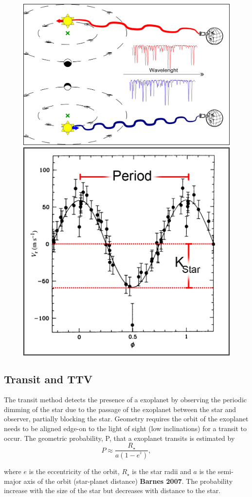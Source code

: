 \begin{figure}
    \centering
        \includegraphics[width=0.5\linewidth]{./figures/introduction/RV_Diagram}
    \includegraphics[width=0.5\linewidth]{./figures/introduction/PhaseFolded_51Pegb_Mayor_et_al_1995}
    \caption{}
    \label{fig:rvdiagram-mayor}
\end{figure}



\subsection{Transit and TTV}
The transit method detects the presence of a exoplanet by observing the periodic dimming of the star due to the passage of the exoplanet between the star and observer, partially blocking the star.
Geometry requires the orbit of the exoplanet needs to be aligned edge-on to the light of sight (low inclinations) for a transit to occur.
The geometric probability, P, that a exoplanet transits is estimated by 
\begin{equation}
P \approx \frac{R_{\star}}{a(1-e^^2)},
\end{equation}

where \(e\) is the eccentricity of the orbit, $R_{\star}$ is the star radii and \(a\) is the semi-major axis of the orbit (star-planet distance) \textbf{Barnes 2007}.
The probability increase with the size of the star but decreases with distance to the star.

